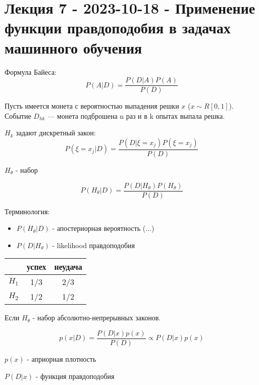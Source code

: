 \section{Лекция 7 - 2023-10-18 - Применение функции правдоподобия в задачах машинного обучения}

Формула Байеса:
\[
P(A|D) = \dfrac{P(D|A) P(A)}{P(D)}
\]

\begin{ex}
  Пусть имеется монета с вероятностью выпадения решки $x$ ($x \sim R[0, 1]$).
  Событие $D_{hk}$ --- монета подброшена n раз и в k опытах выпала решка.
  
  $H_k$ задают дискретный закон:
  $$P(\xi = x_j | D) = \dfrac{P(D|\xi=x_j) P(\xi=x_j)}{P(D)}$$

  $H_\theta$ - набор 

  $$P(H_\theta | D) = \dfrac{P(D|H_\theta) P(H_\theta)}{P(D)}$$

  Терминология:
  \begin{itemize}
    \item $P(H_\theta |D)$ - апостериорная вероятность ($\dots$)
    \item $P(D|H_\theta)$ - likelihood правдоподобия
  \end{itemize}
\end{ex}

\begin{ex}
  \begin{tabular}{|c|c|c|}
    \hline
    & успех & неудача \\
    \hline
    $H_1$ & 1/3 & 2/3 \\
    \hline
    $H_2$ & 1/2 & 1/2 \\
    \hline
  \end{tabular}


\end{ex}

Если $H_\theta$ - набор абсолютно-непрерывных законов.

\[
  p(x|D) = \dfrac{P(D|x) p(x)}{P(D)} \propto P(D|x) p(x)
\]

$p(x)$ - априорная плотность

$P(D|x)$ - функция правдоподобия

